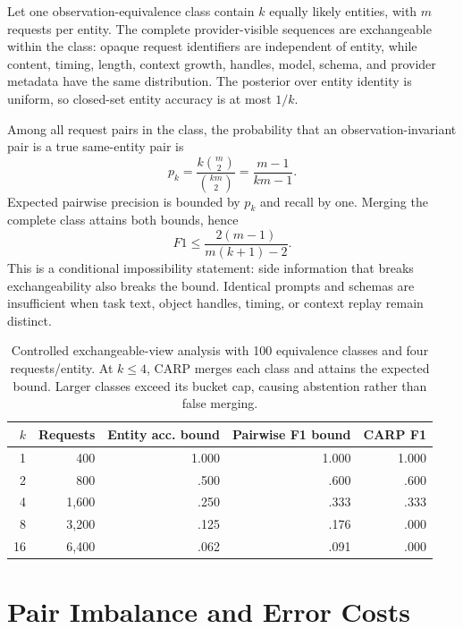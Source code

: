 \documentclass[letterpaper]{article} %
\begin{document}
Let one observation-equivalence class contain $k$ equally likely entities, with $m$ requests per
entity. The complete provider-visible sequences are exchangeable within the class: opaque request
identifiers are independent of entity, while content, timing, length, context growth, handles, model,
schema, and provider metadata have the same distribution.
The posterior over entity identity is uniform, so closed-set entity accuracy is at most $1/k$.

Among all request pairs in the class, the probability that an observation-invariant pair is a true
same-entity pair is
\begin{equation}
p_k = \frac{k\binom{m}{2}}{\binom{km}{2}} = \frac{m-1}{km-1}.
\end{equation}
Expected pairwise precision is bounded by $p_k$ and recall by one. Merging the complete class
attains both bounds, hence
\begin{equation}
F1 \leq \frac{2(m-1)}{m(k+1)-2}.
\end{equation}
This is a conditional impossibility statement: side information that breaks exchangeability also
breaks the bound. Identical prompts and schemas are insufficient when task text, object handles,
timing, or context replay remain distinct.

\begin{table}[t]
\centering
\small
\begin{tabular}{@{}rrrrr@{}}
\toprule
$k$ & Requests & Entity acc. bound & Pairwise F1 bound & CARP F1 \\
\midrule
1 & 400 & 1.000 & 1.000 & 1.000 \\
2 & 800 & .500 & .600 & .600 \\
4 & 1,600 & .250 & .333 & .333 \\
8 & 3,200 & .125 & .176 & .000 \\
16 & 6,400 & .062 & .091 & .000 \\
\bottomrule
\end{tabular}
\caption{Controlled exchangeable-view analysis with 100 equivalence classes and four
requests/entity. At $k\leq4$, CARP merges each class and attains the expected bound. Larger classes
exceed its bucket cap, causing abstention rather than false merging.}
\end{table}

\section{Pair Imbalance and Error Costs}
\end{document}

